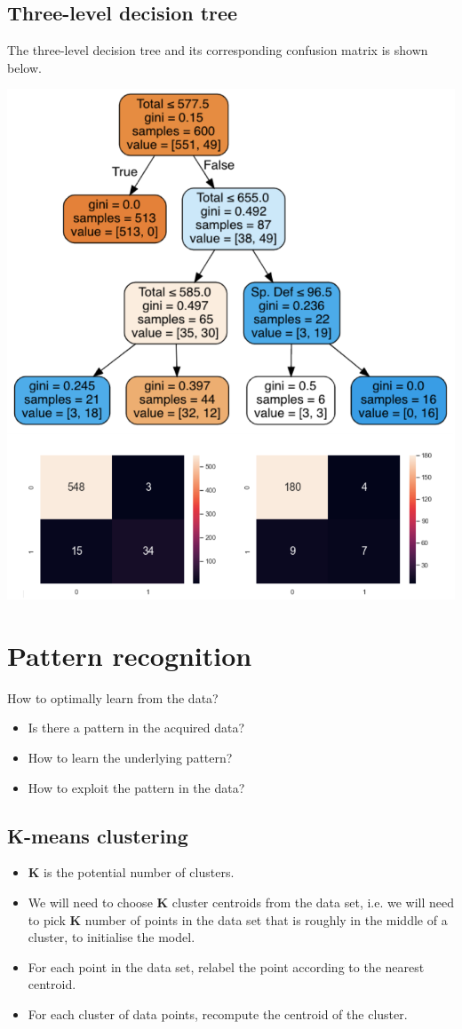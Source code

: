 \documentclass[11pt]{article}
\begin{document}
\subsection{Three-level decision tree}
\label{sec:org329d1ba}
The three-level decision tree and its corresponding confusion matrix is shown below.
\begin{center}
\includegraphics[width=.9\linewidth]{./images/binary-classification-three-level-decision-tree.png}
\end{center}
\section{Pattern recognition}
\label{sec:org703639a}
How to optimally learn from the data?
\begin{itemize}
\item Is there a pattern in the acquired data?
\item How to learn the underlying pattern?
\item How to exploit the pattern in the data?
\end{itemize}
\subsection{K-means clustering}
\label{sec:org4d05385}
\begin{itemize}
\item \textbf{K} is the potential number of clusters.
\item We will need to choose \textbf{K} cluster centroids from the data set, i.e. we will need to pick \textbf{K} number of points in the data set that is roughly in the middle of a cluster, to initialise the model.
\item For each point in the data set, relabel the point according to the nearest centroid.
\item For each cluster of data points, recompute the centroid of the cluster.
\end{itemize}
\end{document}
